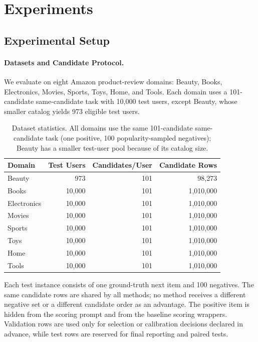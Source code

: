 \section{Experiments}
\label{sec:experiments}

\subsection{Experimental Setup}

\paragraph{Datasets and Candidate Protocol.} We evaluate on eight Amazon
product-review domains: Beauty, Books, Electronics, Movies, Sports, Toys, Home,
and Tools. Each domain uses a 101-candidate same-candidate task with 10,000 test
users, except Beauty, whose smaller catalog yields 973 eligible test users.

\begin{table}[h]
\centering
\small
\caption{Dataset statistics. All domains use the same 101-candidate
same-candidate task (one positive, 100 popularity-sampled negatives); Beauty has
a smaller test-user pool because of its catalog size.}
\label{tab:datasets}
\begin{tabular}{lrrr}
\toprule
Domain & Test Users & Candidates/User & Candidate Rows \\
\midrule
Beauty & 973 & 101 & 98,273 \\
Books & 10,000 & 101 & 1,010,000 \\
Electronics & 10,000 & 101 & 1,010,000 \\
Movies & 10,000 & 101 & 1,010,000 \\
Sports & 10,000 & 101 & 1,010,000 \\
Toys & 10,000 & 101 & 1,010,000 \\
Home & 10,000 & 101 & 1,010,000 \\
Tools & 10,000 & 101 & 1,010,000 \\
\bottomrule
\end{tabular}
\end{table}

Each test instance consists of one ground-truth next item and 100 negatives.
The same candidate rows are shared by all methods; no method receives a
different negative set or a different candidate order as an advantage. The
positive item is hidden from the scoring prompt and from the baseline scoring
wrappers. Validation rows are used only for selection or calibration decisions
declared in advance, while test rows are reserved for final reporting and
paired tests.

